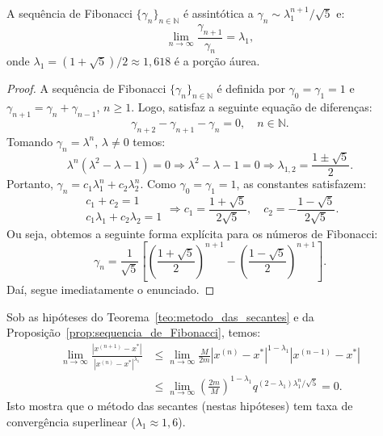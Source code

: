 \begin{prop}\label{prop:sequencia_de_Fibonacci}
  A sequência de Fibonacci $\{\gamma_n\}_{n\in\mathbb{N}}$ é assintótica a $\gamma_n \sim \lambda_1^{n+1}/\sqrt{5}$ e:
\begin{equation*}
  \lim_{n\to\infty} \frac{\gamma_{n+1}}{\gamma_{n}} = \lambda_1,
\end{equation*}
onde $\lambda_1 = (1+\sqrt{5})/2\approx 1,618$ é a porção áurea.
\end{prop}
\begin{proof}
  A sequência de Fibonacci $\{\gamma_n\}_{n\in\mathbb{N}}$ é definida por $\gamma_0 = \gamma_1 = 1$ e $\gamma_{n+1} = \gamma_n + \gamma_{n-1}$, $n\geq 1$. Logo, satisfaz a seguinte equação de diferenças:
  \begin{equation*}
    \gamma_{n+2} - \gamma_{n+1} - \gamma_{n} = 0,\quad n\in\mathbb{N}.
  \end{equation*}
Tomando $\gamma_n = \lambda^n$, $\lambda\neq 0$ temos:
\begin{equation*}
  \lambda^n\left(\lambda^2 - \lambda - 1\right) = 0 \Rightarrow   \lambda^2 - \lambda - 1 = 0 \Rightarrow \lambda_{1,2} = \frac{1 \pm \sqrt{5}}{2}.
\end{equation*}
Portanto, $\gamma_n = c_1\lambda_1^n + c_2\lambda_2^n$. Como $\gamma_0 = \gamma_1 = 1$, as constantes satisfazem:
\begin{equation*}
  \begin{array}{l}
    c_1 + c_2 = 1\\
    c_1\lambda_1 + c_2\lambda_2 = 1
  \end{array}
    \Rightarrow
    c_1 = \frac{1+\sqrt{5}}{2\sqrt{5}},\quad c_2 = -\frac{1-\sqrt{5}}{2\sqrt{5}}.
\end{equation*}
Ou seja, obtemos a seguinte forma explícita para os números de Fibonacci:
\begin{equation*}
  \gamma_n = \frac{1}{\sqrt{5}}\left[\left(\frac{1+\sqrt{5}}{2}\right)^{n+1} - \left(\frac{1-\sqrt{5}}{2}\right)^{n+1}\right].
\end{equation*}
Daí, segue imediatamente o enunciado.
\end{proof}

\begin{obs}
  Sob as hipóteses do Teorema~\ref{teo:metodo_das_secantes} e da Proposição~\ref{prop:sequencia_de_Fibonacci}, temos:
  \begin{align*}
    \lim_{n\to\infty} \frac{|x^{(n+1)}-x^*|}{|x^{(n)} - x^*|^{\lambda_1}} &\leq \lim_{n\to\infty} \frac{M}{2m}|x^{(n)}-x^*|^{1-\lambda_1}|x^{(n-1)}-x^*| \\
    &\leq \lim_{n\to\infty} \left(\frac{2m}{M}\right)^{1-\lambda_1}q^{(2-\lambda_1)\lambda_1^{n}/\sqrt{5}} = 0.
  \end{align*}
Isto mostra que o método das secantes (nestas hipóteses) tem taxa de convergência superlinear ($\lambda_1 \approx 1,6$).
\end{obs}


